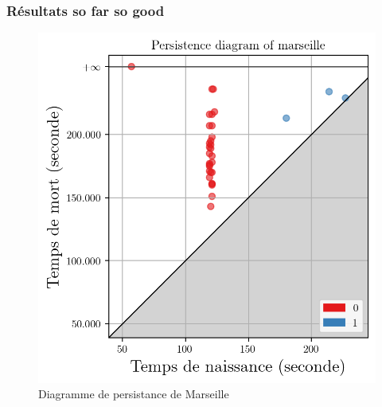 \documentclass{beamer}
\begin{document}
\begin{frame}
    \frametitle{Résultats so far so good}

    \begin{figure}[h]
        \begin{minipage}[c]{.45\linewidth}
            \centering
            \includegraphics[width=1\textwidth]{../../Code/images/pd_marseille.png}
            \caption{Diagramme de persistance de Marseille}
        \end{minipage}
        \hfill
        \begin{minipage}[c]{.45\linewidth}
            \centering

\end{minipage}
\end{figure}
\end{frame}
\end{document}
